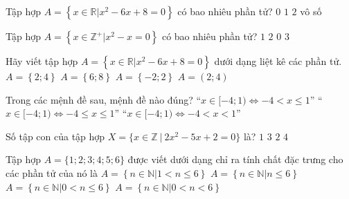\begin{ex}%
	Tập hợp $A=\left\{x\in \mathbb{R}\big| x^2-6x+8=0\right\}$ có bao nhiêu phần tử?
	\choice
	{$0$}
	{$1$}
	{\True $2$}
	{vô số}
\end{ex}
\begin{ex}%
	Tập hợp $A=\left\{x\in \mathbb{Z}^{+}\big|x^2-x=0\right\}$ có bao nhiêu phần tử?
	\choice
	{\True $1$}
	{$2$}
	{$0$}
	{$3$}
\end{ex}
\begin{ex}%
	Hãy viết tập hợp $A=\left\{x\in \mathbb{R}\big| x^2-6x+8=0\right\}$ dưới dạng liệt kê các phần tử.
	\choice
	{\True $A=\left\{2;4\right\}$}
	{$A=\left\{6;8\right\}$}
	{$A=\left\{-2;2\right\}$}
	{$A=\left(2; 4\right)$}
\end{ex}
\begin{ex}%
	Trong các mệnh đề sau, mệnh đề nào đúng?
	\choice{\True ``$x\in [-4;1)\Leftrightarrow -4 \le x <1$''}
	{``$x\in [-4;1)\Leftrightarrow -4 < x \le 1 $''}
	{``$x\in [-4;1)\Leftrightarrow -4 \le x \le 1$''}
	{``$x\in [-4;1)\Leftrightarrow -4 < x <1$''}
	\loigiai{ Ta có ``$x\in [-4;1)\Leftrightarrow -4 \le x <1$''.
	}
\end{ex}
\begin{ex}%
	Số tập con của tập hợp $X=\{x\in\mathbb{Z}\ |\ 2x^2-5x+2=0\}$ là?
	\choice
	{$1$}
	{$3$}
	{\True $2$}
	{$4$}
\end{ex}
\begin{ex}%
	Tập hợp $A=\{1;2;3;4;5;6\}$ được viết dưới dạng chỉ ra tính chất đặc trưng cho các phần tử của nó là
	\choice
	{$A=\left\{n\in \mathbb{N}\big| 1<n\le 6\right\}$}
	{$A=\left\{n\in \mathbb{N}\big| n\le 6\right\}$}
	{\True $A=\left\{n\in \mathbb{N}\big| 0<n\le 6\right\}$}
	{$A=\left\{n\in \mathbb{N}\big| 0<n<6\right\}$}
\end{ex}
